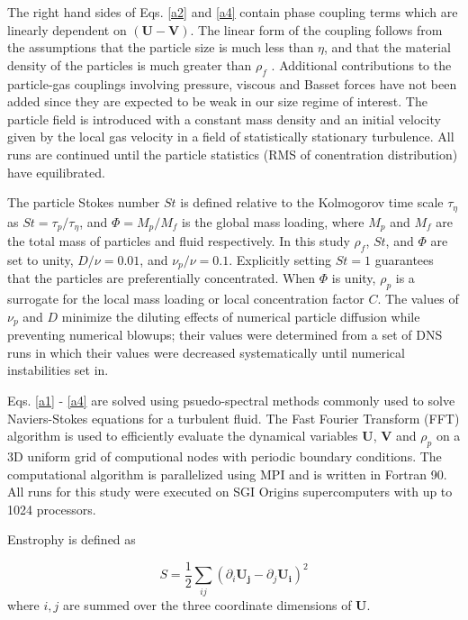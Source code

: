 \documentclass[aps,pra,twocolumn,groupedaddress,showkeys,showpacs,floatfix]{revtex4}
\begin{document}
   The right hand sides of Eqs. \ref{a2} and \ref{a4} contain phase coupling terms
   which are linearly dependent on $\mathbf{(U-V)}$.   
   The linear form of the coupling follows from the assumptions that the 
   particle size is much less than $\eta$, and that the material density of the 
particles is much greater than $\rho_f$ \cite{Squires:1}.
   Additional contributions to the particle-gas couplings involving pressure,
viscous and Basset forces \cite{Elghobashi:2} have not
   been added since they are expected to be weak in our size regime of 
interest. 
   The particle field is introduced with a constant mass density and an initial 
velocity given by the local gas velocity in a field of statistically stationary turbulence.
   All runs are continued until the particle statistics (RMS of conentration 
distribution) have equilibrated.

   The particle Stokes number $St$ is defined relative to the Kolmogorov time 
scale $\tau_{\eta}$ as $St = \tau_p / \tau_\eta$, and $\Phi =  M_p/M_f$ is the 
global mass loading, where $M_p$ and $M_f$ are the total mass of particles and 
fluid respectively.
   In this study $\rho_f$, $St$, and $\Phi$ are set to unity, $D/\nu = 0.01 $, 
   and $\nu_p/\nu = 0.1$. Explicitly setting $St = 1$ guarantees that the 
particles
   are preferentially concentrated. When $\Phi$ is unity, 
   $\rho_p$ is a surrogate for the local mass loading or local concentration
   factor $C$.  The values of $\nu_p$ and $D$
   minimize the diluting effects of numerical particle diffusion 
   while preventing numerical blowups; their values were determined 
   from a set of DNS runs in which their values were decreased  systematically  
   until numerical instabilities set in. 


   Eqs. \ref{a1} - \ref{a4} are solved using psuedo-spectral methods commonly
   used to solve Naviers-Stokes equations for a turbulent fluid.  The Fast
   Fourier Transform (FFT) algorithm is used to efficiently evaluate
   the dynamical variables $\mathbf{U}$, $\mathbf{V}$ and $\rho_p$ on a 3D 
uniform grid of 
   computional nodes with periodic boundary conditions. 
   The computational 
algorithm is parallelized using MPI and is written in Fortran 90. All runs for 
this study were executed on  SGI Origins supercomputers with up to 1024 
processors. 
   
   Enstrophy is defined as

   \begin{equation}
    S = \frac{1}{2}\sum_{ij}({ \partial_i \mathbf{U_j} - \partial_j
\mathbf{U_i} })^2  \label{a5}
   \end{equation}
where $i,j$ are summed over the three coordinate dimensions of $\mathbf{U}$.
\end{document}
